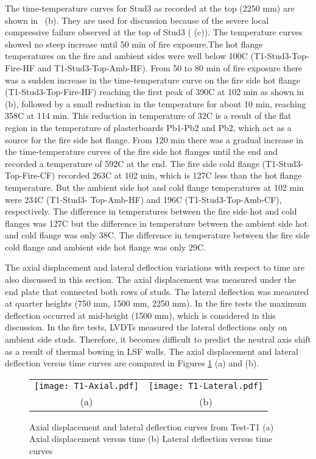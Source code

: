 The time-temperature curves for Stud3 as recorded at the top (2250 mm) are shown in ~(b). They are used for discussion because of the severe local compressive failure observed at the top of Stud3 ( (c)). The temperature curves showed no steep increase until 50 min of fire exposure.The hot flange temperatures on the fire and ambient sides were well below 100\degree C (T1-Stud3-Top-Fire-HF and T1-Stud3-Top-Amb-HF). From 50 to 80 min of fire exposure there was a sudden increase in the time-temperature curve on the fire side hot flange (T1-Stud3-Top-Fire-HF) reaching the first peak of 390\degree C at 102 min as shown in  (b), followed by a small reduction in the temperature for about 10 min, reaching 358\degree C at 114 min. This reduction in temperature of 32\degree C is a result of the flat region in the temperature of plasterboards Pb1-Pb2 and Pb2, which act as a source for the fire side hot flange. From 120 min there was a gradual increase in the time-temperature curves of the fire side hot flanges until the end and recorded a temperature of 592\degree C at the end. The fire side cold flange (T1-Stud3-Top-Fire-CF) recorded 263\degree C at 102 min, which is 127\degree C less than the hot flange temperature. But the ambient side hot and cold flange temperatures at 102 min were 234\degree C (T1-Stud3- Top-Amb-HF) and 196\degree C (T1-Stud3-Top-Amb-CF), respectively. The difference in temperatures between the fire side hot and cold flanges was 127\degree C but the difference in temperature between the ambient side hot and cold flange was only 38\degree C. The difference in temperature between the fire side cold flange and ambient side hot flange was only 29\degree C.

The axial displacement and lateral deflection variations with respect to time are also discussed in this section. The axial displacement was measured under the end plate that connected both rows of studs. The lateral deflection was measured at quarter heights (750 mm, 1500 mm, 2250 mm). In the fire tests the maximum deflection occurred at mid-height (1500 mm), which is considered in this discussion. In the fire tests, LVDTs measured the lateral deflections only on ambient side studs. Therefore, it becomes difficult to predict the neutral axis shift as a result of thermal bowing in LSF walls. The axial displacement and lateral deflection versus time curves are compared in Figures \ref{fig:T1-Axial-Lateral} (a) and (b).
	\begin{figure}[!htbp]
	\centering
		\begin{tabular}{cc}
			\texttt{[image: T1-Axial.pdf]} & \texttt{[image: T1-Lateral.pdf]} \\
			(a) & (b) \\
		\end{tabular} 
		\caption{Axial displacement and lateral deflection curves from Test-T1 (a) Axial displacement versus time (b) Lateral deflection versus time curves}
		\label{fig:T1-Axial-Lateral}
\end{figure}

